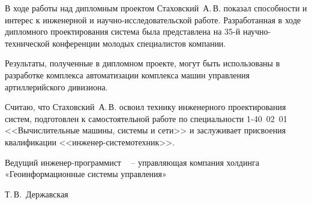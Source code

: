 {%


В ходе работы над дипломным проектом Стаховский~А.\,В. показал способности и интерес к инженерной и
	научно-исследовательской работе. Разработанная в ходе дипломного проектирования система была представлена на
	35-й научно-технической конференции молодых специалистов компании.

Результаты, полученные в дипломном проекте, могут быть использованы в разработке комплекса автоматизации комплекса
	машин управления артиллерийского дивизиона.


Считаю, что Стаховский~А.\,В. освоил технику инженерного проектирования систем, подготовлен к самостоятельной работе по
	специальности 1-40~02~01
<<Вычислительные машины, системы и сети>> и заслуживает присвоения квалификации <<инженер-системотехник>>.

  \vfill
  \noindent
  \begin{minipage}{0.54\textwidth}
    \begin{flushleft}
	    Ведущий инженер-программист \company~ -- управляющая компания
	    холдинга «Геоинформационные системы управления»
    \end{flushleft}
  \end{minipage}
  \begin{minipage}{0.44\textwidth}
    \begin{flushright}
       \underline{\hspace*{3cm}}Т.\,В.~Державская
    \end{flushright}
  \end{minipage}
}


\clearpage
